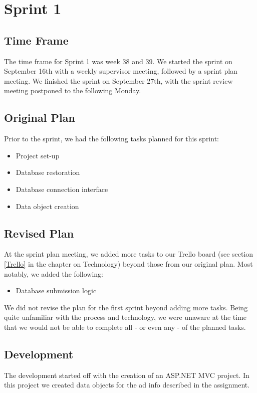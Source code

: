 \chapter{Sprint 1}

\section{Time Frame}
The time frame for Sprint 1 was week 38 and 39. We started the sprint on September 16th with a weekly supervisor meeting, followed by a sprint plan meeting. We finished the sprint on September 27th, with the sprint review meeting postponed to the following Monday.

\section{Original Plan}
Prior to the sprint, we had the following tasks planned for this sprint:
\begin{itemize}
	\item Project set-up
	\item Database restoration
	\item Database connection interface
	\item Data object creation
\end{itemize}

\section{Revised Plan}
At the sprint plan meeting, we added more tasks to our Trello board (see section \ref{Trello} in the chapter on Technology) beyond those from our original plan. Most notably, we added the following:
\begin{itemize}
	\item Database submission logic
\end{itemize}

We did not revise the plan for the first sprint beyond adding more tasks. Being quite unfamiliar with the process and technology, we were unaware at the time that we would not be able to complete all - or even any - of the planned tasks.

\section{Development}
The development started off with the creation of an ASP.NET MVC project. In this project we created data objects for the ad info described in the assignment.

